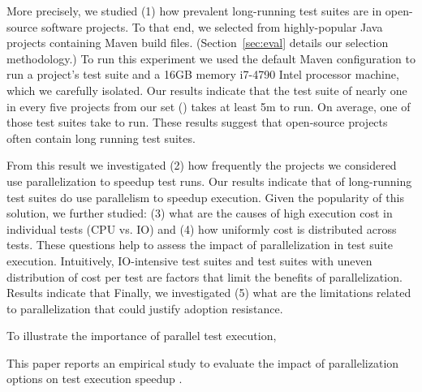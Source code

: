 

More precisely, we studied (1) how prevalent long-running test suites
are in open-source software projects.  To that end, we selected from
\github{} \numSubjs{} highly-popular Java projects containing Maven
build files.  (Section~\ref{sec:eval} details our selection
methodology.)  To run this experiment we used the default Maven
configuration to run a project's test suite and a 16GB memory i7-4790
Intel processor machine, which we carefully isolated.  Our results
indicate that the test suite of nearly one in every five projects from
our set (\percentMedLongRunning) takes at least 5m to run.  On
average, one of those test suites take \averageMedLongRunning{} to
run.  These results suggest that open-source projects often contain
long running test suites.

  From this result we investigated (2) how frequently
the projects we considered use parallelization to speedup test runs.
Our results indicate that \percentParallelForLongRunning{} of
long-running test suites do use parallelism to speedup execution.
Given the popularity of this solution, we further studied: (3) what
are the causes of high execution cost in individual tests (CPU vs. IO)
and (4) how uniformly cost is distributed across tests.  These
questions help to assess the impact of parallelization in test suite
execution.  Intuitively, IO-intensive test suites and test suites with
uneven distribution of cost per test are factors that limit the
benefits of parallelization.  Results indicate that 
Finally, we investigated (5) what are the limitations related to
parallelization that could justify adoption resistance.

\Fix{--------------}


To illustrate the importance of parallel test execution, 

This paper reports an empirical study to evaluate the impact of
parallelization options on test execution speedup  .


 	
